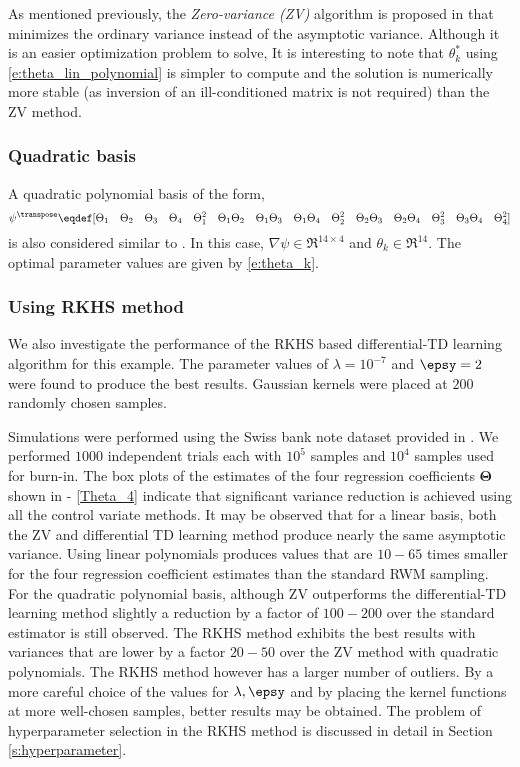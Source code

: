 As mentioned previously, the \textit{Zero-variance (ZV)} algorithm is proposed in \cite{papmirgir}  that minimizes the ordinary variance instead of the asymptotic variance. Although it is an easier optimization problem to solve, It is interesting to note that $\theta_k^*$  using \eqref{e:theta_lin_polynomial} is simpler to compute and the solution is numerically more stable (as inversion of an ill-conditioned matrix is not required) than the ZV method.
\noindent \subsubsection*{Quadratic basis}
A quadratic polynomial basis of the form,
\[\psi^\transpose \eqdef [\Theta_1 \quad \Theta_2 \quad \Theta_3 \quad \Theta_4 \quad \Theta_1^2 \quad \Theta_1 \Theta_2 \quad \Theta_1\Theta_3 \quad \Theta_1 \Theta_4 \quad \Theta_2^2 \quad \Theta_2\Theta_3 \quad \Theta_2\Theta_4 \quad \Theta_3^2 \quad \Theta_3 \Theta_4 \quad \Theta_4^2] \]
is also considered similar to \cite{papmirgir}.  In this case, $\nabla \psi \in \Re^{14 \times 4}$ and $\theta_k \in \Re^{14}$. The optimal parameter values are given by \eqref{e:theta_k}.

\noindent \subsubsection*{Using RKHS method}
We also investigate the performance of the RKHS based differential-TD learning algorithm for this example.  The parameter values of $\lambda = 10^{-7}$ and $\epsy = 2$ were found to produce the best results.  Gaussian kernels were placed at $200$ randomly chosen samples.

Simulations were performed using the Swiss bank note dataset provided in \cite{papmirgir}. We performed $1000$ independent trials each with  $10^5$ samples and $10^4$ samples used for burn-in. The box plots of the estimates of the four regression coefficients $\boldsymbol{\Theta}$ shown in  - \ref{Theta_4} indicate that significant variance reduction is  achieved using all the control variate methods. It may be observed that for a linear basis, both the ZV and differential TD learning method produce nearly the same asymptotic variance. Using linear polynomials produces values that are $10-65$ times smaller for the four regression coefficient estimates than the standard RWM sampling. For the quadratic polynomial basis, although ZV  outperforms the differential-TD learning method slightly a reduction by a factor of $100-200$ over the standard estimator is still observed. The RKHS method exhibits the best results with variances that are lower by a factor $20-50$ over the ZV method with quadratic polynomials. The RKHS method however has a larger number of outliers. By a more careful choice of the values for $\lambda,\epsy$ and by placing the kernel functions at more well-chosen samples, better results may be obtained. The problem of hyperparameter selection in the RKHS method is discussed in detail in Section \ref{s:hyperparameter}.

